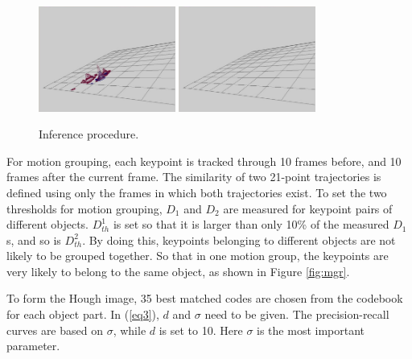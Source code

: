 \begin{figure}
\includegraphics[width=0.4\textwidth,bb=0 0 760 585]{inf7.jpg}
\includegraphics[width=0.4\textwidth,bb=0 0 760 585]{inf8.jpg}\\
\caption[Inference procedure]{Inference procedure.}
\label{fig:inf}
\end{figure}


For motion grouping, each keypoint is tracked through 10 frames before, and 10 frames after the current frame. The similarity of two 21-point trajectories is defined using only   the frames in which both trajectories exist. To set the two thresholds for motion grouping, $D_1$ and $D_2$ are  measured for keypoint pairs of different objects. $D^1_{th}$ is set so that it is larger than only 10\% of the measured $D_1$s, and so is $D^2_{th}$. By doing this, keypoints belonging to different objects are not likely to be grouped together. So that in one motion group, the keypoints are very likely to belong to the same object, as shown in Figure \ref{fig:mgr}.

To form the Hough image, 35 best matched codes are chosen from the codebook for each object part. In (\ref{eq3}), $d$ and $\sigma$ need to be given. The precision-recall curves are based on $\sigma$, while $d$ is set to 10. Here $\sigma$ is the most important parameter.

